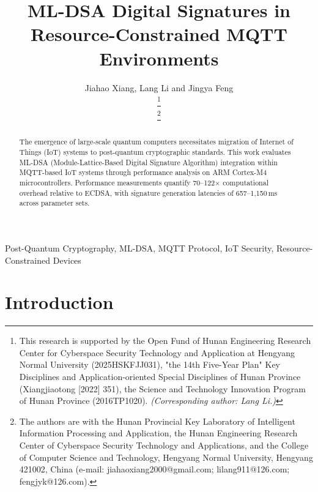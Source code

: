 \documentclass[final, twoside]{IEEEtran} %
\begin{document}
\title{ML-DSA Digital Signatures in Resource-Constrained MQTT Environments}

\author{ Jiahao Xiang, Lang Li  and Jingya Feng

	\thanks{This research is supported by the Open Fund of Hunan Engineering Research Center for Cyberspace Security Technology and Application at Hengyang Normal University (2025HSKFJJ031), "the 14th Five-Year Plan" Key Disciplines and Application-oriented Special Disciplines of Hunan Province (Xiangjiaotong [2022] 351), the Science and Technology Innovation Program of Hunan Province (2016TP1020). \textit{(Corresponding
			author: Lang Li.)}}

	\thanks{The authors are with the Hunan Provincial Key Laboratory of Intelligent Information Processing and Application, the Hunan Engineering Research Center of Cyberspace Security Technology and Applications, and the College of Computer Science and Technology, Hengyang Normal University, Hengyang 421002, China (e-mail: jiahaoxiang2000@gmail.com; lilang911@126.com; fengjyk@126.com).}

}


\maketitle

\begin{abstract}
	The emergence of large-scale quantum computers necessitates migration of Internet of Things (IoT) systems to post-quantum cryptographic standards. This work evaluates ML-DSA (Module-Lattice-Based Digital Signature Algorithm) integration within MQTT-based IoT systems through performance analysis on ARM Cortex-M4 microcontrollers. Performance measurements quantify 70--122$\times$ computational overhead relative to ECDSA, with signature generation latencies of 657--1,150\,ms across parameter sets.
\end{abstract}

\begin{IEEEkeywords}
	Post-Quantum Cryptography, ML-DSA, MQTT Protocol, IoT Security, Resource-Constrained Devices
\end{IEEEkeywords}

\section{Introduction}
\end{document}
